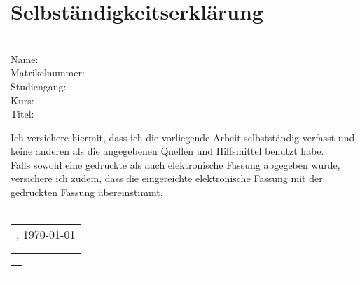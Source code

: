 \section*{Selbständigkeitserklärung}
\vspace{1cm}
\begin{tabbing}
    \hspace{.175\textwidth} \= \hspace{.825\textwidth}\=\kill\\
    Name:		            \> \myStudentenname\\
    Matrikelnummer:		    \> \myMatrikelnummer\\
    Studiengang:		    \> \myStudiengang\\
    Kurs:				    \> \myKurs\\
    Titel:	                \> \myTitle             \>\\
\end{tabbing}
\vspace{1cm}
Ich versichere hiermit, dass ich die vorliegende Arbeit selbstständig verfasst und
keine anderen als die angegebenen Quellen und Hilfsmittel benutzt habe.\\
Falls sowohl eine gedruckte als auch elektronische Fassung abgegeben wurde,
versichere ich zudem, dass die eingereichte elektronische Fassung mit der gedruckten
Fassung übereinstimmt.\\
\vspace{2cm}\\
\begin{minipage}{0.99\textwidth}
	\centering
	\begin{minipage}[t]{0.5\textwidth}
	\hspace{2cm}
		\begin{tabular}{c}
			\myOrt, {\today}\\
			\\
			\\
		\end{tabular}
	\end{minipage}
	\hfill
	\begin{minipage}[t]{0.4\textwidth}
		\begin{tabular}{c}
			{\myStudentenname}\\
			\\
			\\
		\end{tabular}
	\end{minipage}
\end{minipage}
